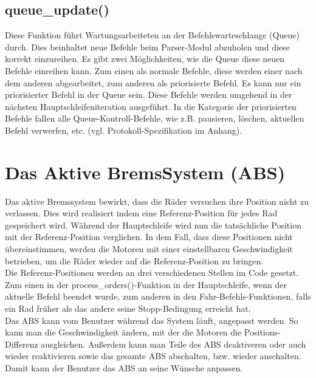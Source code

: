 \subsection{queue\_update()\label{chapter_queue_update}}
Diese Funktion führt Wartungsarbeiteten an der Befehlswarteschlange (Queue) durch. Dies beinhaltet neue
Befehle beim Parser-Modul abzuholen und diese korrekt einzureihen. Es gibt zwei Möglichkeiten, wie die Queue
diese neuen Befehle einreihen kann. Zum einen als normale Befehle, diese werden einer nach dem anderen abgearbeitet,
zum anderen als priorisierte Befehl. Es kann nur ein priorisierter Befehl in der Queue sein. Diese Befehle werden
umgehend in der nächsten Haupt\-schleifen\-iteration ausgeführt. In die Kategorie der priorisierten Befehle fallen
alle Queue-Kontroll-Befehle, wie z.B. pausieren, löschen, aktuellen Befehl verwerfen, etc. (vgl. Protokoll-Spezifikation
im Anhang).
\section{Das Aktive BremsSystem (ABS)}
Das aktive Bremssystem bewirkt, dass die Räder versuchen ihre Position nicht zu verlassen. Dies wird realisiert indem
eine Referenz-Position für jedes Rad gespeichert wird. Während der Hauptschleife wird nun die tatsächliche Position mit
der Referenz-Position verglichen. In dem Fall, dass diese Positionen nicht übereinstimmen, werden die Motoren mit einer
einstellbaren Geschwindigkeit betrieben, um die Räder wieder auf die Referenz-Position zu bringen.\\
Die Referenz-Positionen werden an drei verschiedenen Stellen im Code gesetzt. Zum einen in der process\_\-orders()-Funktion
in der Hauptschleife, wenn der aktuelle Befehl beendet wurde, zum anderen in den Fahr-Befehls-Funktionen, falls ein Rad
früher als das andere seine Stopp-Bedingung erreicht hat.\\
Das ABS kann vom Benutzer während das System läuft, angepasst werden. So kann man die Geschwindigkeit ändern, mit der
die Motoren die Positions-Differenz ausgleichen. Außerdem kann man Teile des ABS deaktiveren oder auch wieder reaktivieren
sowie das gesamte ABS abschalten, bzw. wieder anschalten. Damit kann der Benutzer das ABS an seine Wünsche anpassen.
